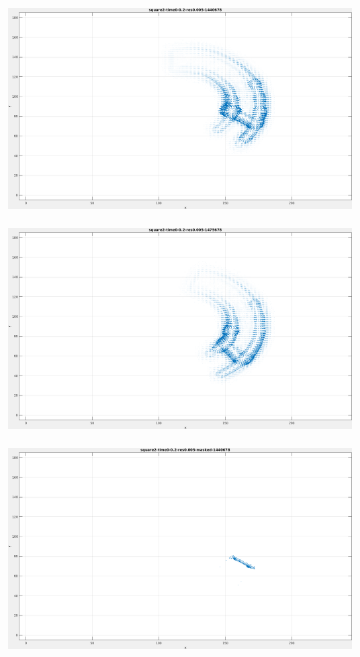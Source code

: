 \begin{figure}[tb]
\centering
\begin{subfigure}{.45\textwidth}
  \centering
  \includegraphics[height=.6\linewidth]{figs/square2/square2-1.png}
  \caption{}
\end{subfigure}
\begin{subfigure}{.45\textwidth}
  \centering
  \includegraphics[height=.6\linewidth]{figs/square2/square2-2.png}
  \caption{}
\end{subfigure}
\begin{subfigure}{.45\textwidth}
  \includegraphics[height=.6\linewidth]{figs/square2/square2-masked-1.png}

\end{subfigure}
\end{figure}
